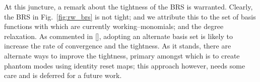 \par
At this juncture, a remark about the tightness of the BRS is warranted. Clearly, the BRS in Fig.~\ref{fig:rw_brs} is not tight; and we attribute this to the set of basis functions with which are currently working--monomials; and the degree relaxation. As commented in [], adopting an alternate basis set is likely to increase the rate of convergence and the tightness. As it stands, there are alternate ways to improve the tightness, primary amongst which is to create phantom modes using identity reset maps; this approach however, needs some care and is deferred for a future work.
